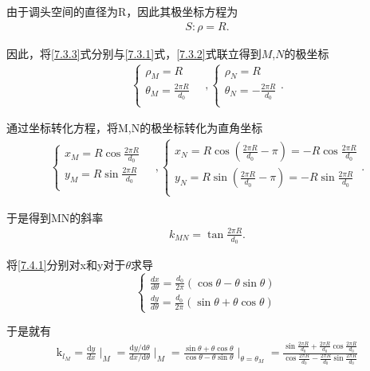 \documentclass[../main.tex]{subfiles}
\begin{document}
\par 由于调头空间的直径为R，因此其极坐标方程为
\begin{align}
S:\rho =R. \label{7.3.3} 
\end{align}
\par 因此，将\eqref{7.3.3}式分别与\eqref{7.3.1}式，\eqref{7.3.2}式联立得到$M$,$N$的极坐标
\begin{gather}\label{1.........41}
\begin{cases}
\rho _M=R\\
\theta _M=\frac{2\pi R}{d_0}\\
\end{cases}
\quad,
\begin{cases}
\rho _N=R\\
\theta _N=-\frac{2\pi R}{d_0}\\
\end{cases}.
\end{gather}
\par 通过坐标转化方程，将M,N的极坐标转化为直角坐标
\begin{gather}\label{1.........42}
\begin{cases}
x_M = R\cos\frac{2\pi R}{d_0}\\
y_M = R\sin\frac{2\pi R}{d_0}\\
\end{cases}
\quad,
\begin{cases}
x_N = R\cos(\frac{2\pi R}{d_0}-\pi)= - R\cos\frac{2\pi R}{d_0}\\
y_N = R\sin(\frac{2\pi R}{d_0}-\pi)= - R\sin\frac{2\pi R}{d_0}
    \\
\end{cases}.
\end{gather}
\par 于是得到MN的斜率
\begin{align}
k_{MN}=\tan\frac{2\pi R}{d_0}.\label{7.3.4}
\end{align}
\par 将\eqref{7.4.1}分别对x和y对于$\theta $求导
\[
\begin{cases}\label{1.........44}
\frac{dx}{d\theta} = \frac{d_0}{2\pi} (\cos\theta - \theta\sin\theta) \\
\frac{dy}{d\theta} = \frac{d_0}{2\pi} (\sin\theta + \theta\cos\theta)
\end{cases}
\]
\par 于是就有
\begin{align}\label{1.........45}
    \text{k}_{l_M}=\frac{\text{d}y}{dx}\mid _{M}^{}=\frac{\text{d}y/\text{d}\theta}{dx/\text{d}\theta}\mid _{M}^{}=\frac{\sin \theta +\theta \cos \theta}{\cos \theta -\theta \sin \theta}\mid _{\theta =\theta _M}^{}=\frac{\sin \frac{2\pi R}{d_0}+\frac{2\pi R}{d_0}\cos \frac{2\pi R}{d_0}}{\cos \frac{2\pi R}{d_0}-\frac{2\pi R}{d_0}\sin \frac{2\pi R}{d_0}}
\end{align}
\end{document}
